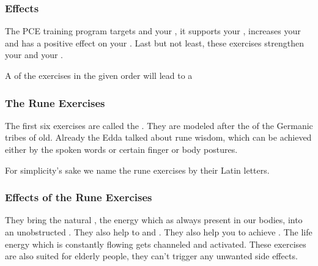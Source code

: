 \begin{frame}
  \frametitle{Effects}

  The PCE training program targets  and your ,
  it supports your ,
  increases your  and has a positive effect on your .
  Last but not least, these exercises strengthen your  and your .

  A  of the exercises in the given order will lead to a 
\end{frame}

\begin{frame}
  \frametitle{The Rune Exercises}

  The first six exercises are called the .
  They are modeled after the  of the Germanic tribes of old.
  Already the Edda talked about rune wisdom, which can be achieved either by the spoken words or certain finger or body postures.


  For simplicity's sake we name the rune exercises by their Latin letters.

  \end{frame}

\begin{frame}
  \frametitle{Effects of the Rune Exercises}

  
  They bring the natural , the energy which as always present in our bodies, into an unobstructed .
  They also help to  and .
  They also help you to achieve .
  The life energy which is constantly flowing gets channeled and activated.
  These exercises are also suited for elderly people, they can't trigger any unwanted side effects.
  

\end{frame}


